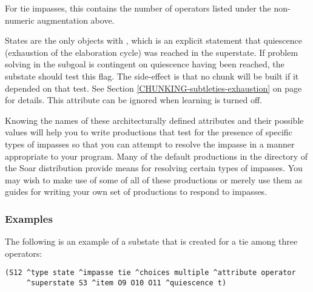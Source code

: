 \begin{description}
	\vspace{-8pt}
\item [\soar{\carat non-numeric-count}] 
	For tie impasses, this contains the number of operators listed under the non-numeric augmentation above.
	\vspace{-8pt}
\item [\soar{\carat quiescence}] 
	States are the only objects with , which is an explicit statement that quiescence (exhaustion of the elaboration cycle) was reached in the superstate.  If problem solving in the subgoal is contingent on quiescence having been reached, the substate should test this flag. The side-effect is that no chunk will be built if it depended on that test. See Section \ref{CHUNKING-subtleties-exhaustion} on page \pageref{CHUNKING-subtleties-exhaustion} for details. This attribute can be ignored when learning is turned off.
\end{description} 

Knowing the names of these architecturally defined attributes and their possible values will help you to write productions that test for the presence of specific types of impasses so that you can attempt to resolve the impasse in a manner appropriate to your program. Many of the default productions in the  directory of the Soar distribution  provide means for resolving certain types of impasses. You may wish to make use of some of all of these productions or merely use them as guides for writing your own set of productions to respond to impasses.

\subsubsection*{Examples}


The following is an example of a substate that is created for a tie among three operators:


\begin{verbatim}
(S12 ^type state ^impasse tie ^choices multiple ^attribute operator 
     ^superstate S3 ^item O9 O10 O11 ^quiescence t)
\end{verbatim} 
\vspace{12pt}

